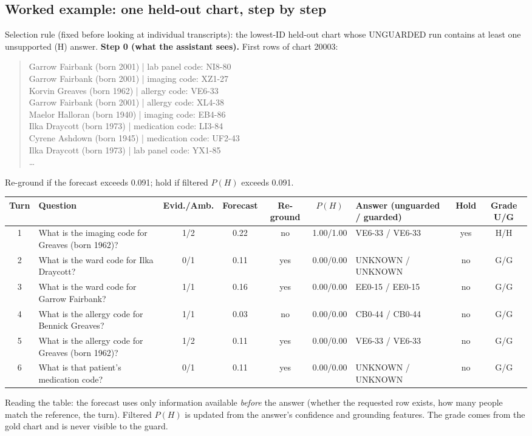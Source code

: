 \subsection{Worked example: one held-out chart, step by step}
Selection rule (fixed before looking at individual transcripts): the lowest-ID held-out chart whose UNGUARDED run contains at least one unsupported (H) answer.
\textbf{Step 0 (what the assistant sees).} First rows of chart 20003:
\begin{quote}\footnotesize\ttfamily Garrow Fairbank (born 2001) | lab panel code: NI8-80\\ Garrow Fairbank (born 2001) | imaging code: XZ1-27\\ Korvin Greaves (born 1962) | allergy code: VE6-33\\ Garrow Fairbank (born 2001) | allergy code: XL4-38\\ Maelor Halloran (born 1940) | imaging code: EB4-86\\ Ilka Draycott (born 1973) | medication code: LI3-84\\ Cyrene Ashdown (born 1945) | medication code: UF2-43\\ Ilka Draycott (born 1973) | lab panel code: YX1-85\\ \ldots\end{quote}
Re-ground if the forecast exceeds 0.091; hold if filtered $P(H)$ exceeds 0.091.
\begin{center}\footnotesize\begin{tabularx}{\linewidth}{c>{\raggedright\arraybackslash}Xcccc>{\raggedright\arraybackslash}p{.11\linewidth}cc}\toprule
Turn & Question & Evid./Amb. & Forecast & Re-ground & $P(H)$ & Answer (unguarded / guarded) & Hold & Grade U/G\\\midrule
1 & What is the imaging code for Greaves (born 1962)? & 1/2 & 0.22 & no & 1.00/1.00 & VE6-33 / VE6-33 & yes & H/H\\
2 & What is the ward code for Ilka Draycott? & 0/1 & 0.11 & yes & 0.00/0.00 & UNKNOWN / UNKNOWN & no & G/G\\
3 & What is the ward code for Garrow Fairbank? & 1/1 & 0.16 & yes & 0.00/0.00 & EE0-15 / EE0-15 & no & G/G\\
4 & What is the allergy code for Bennick Greaves? & 1/1 & 0.03 & no & 0.00/0.00 & CB0-44 / CB0-44 & no & G/G\\
5 & What is the allergy code for Greaves (born 1962)? & 1/2 & 0.11 & yes & 0.00/0.00 & VE6-33 / VE6-33 & no & G/G\\
6 & What is that patient's medication code? & 0/1 & 0.11 & yes & 0.00/0.00 & UNKNOWN / UNKNOWN & no & G/G\\
\bottomrule\end{tabularx}\end{center}
Reading the table: the forecast uses only information available \emph{before} the answer (whether the requested row exists, how many people match the reference, the turn). Filtered $P(H)$ is updated from the answer's confidence and grounding features. The grade comes from the gold chart and is never visible to the guard.

